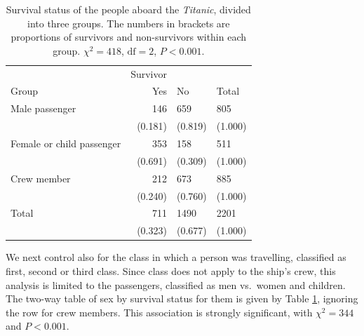 \documentclass[11pt,a4paper,openany]{book}
\begin{document}
\begin{longtable}[]{@{}lrll@{}}
\caption{\label{tab:t-titanic2} Survival status of the people aboard the
\emph{Titanic}, divided into three groups. The numbers in brackets are
proportions of survivors and non-survivors within each group.
\(\chi^{2}=418\), \(\text{df}=2\), \(P<0.001\).}\tabularnewline
\toprule
& Survivor & &\tabularnewline
Group & Yes & No & Total\tabularnewline
Male passenger & 146 & 659 & 805\tabularnewline
& (0.181) & (0.819) & (1.000)\tabularnewline
Female or child passenger & 353 & 158 & 511\tabularnewline
& (0.691) & (0.309) & (1.000)\tabularnewline
Crew member & 212 & 673 & 885\tabularnewline
& (0.240) & (0.760) & (1.000)\tabularnewline
Total & 711 & 1490 & 2201\tabularnewline
& (0.323) & (0.677) & (1.000)\tabularnewline
\bottomrule
\end{longtable}

We next control also for the class in which a person was travelling,
classified as first, second or third class. Since class does not apply
to the ship's crew, this analysis is limited to the passengers,
classified as men vs.~women and children. The two-way table of sex by
survival status for them is given by Table \ref{tab:t-titanic2},
ignoring the row for crew members. This association is strongly
significant, with \(\chi^{2}=344\) and \(P<0.001\).
\end{document}
